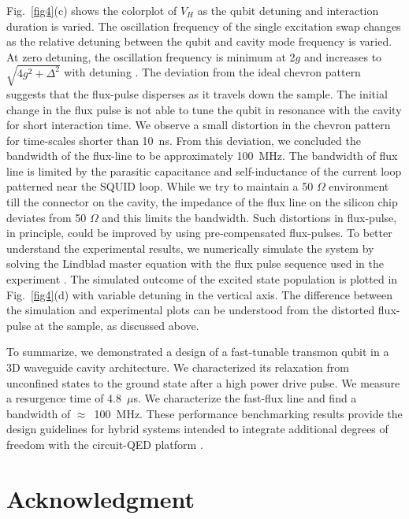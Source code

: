 \documentclass[a4paper, amsfonts, amssymb, amsmath, reprint,showkeys,nofootinbib,superscriptaddress]{revtex4-2}
\begin{document}
%
%
Fig.~\ref{fig4}(c) shows the colorplot of $V_H$ as the qubit 
detuning and interaction duration is varied. The oscillation frequency 
of the single excitation swap changes as the relative detuning between the qubit 
and cavity mode frequency is varied.
%
At zero detuning, the oscillation frequency is minimum at 2$g$ and increases 
to $\sqrt{4 g^2 + \Delta^2}$ with detuning \cite{oconnell_quantum_2010}. 
%
The deviation from the ideal chevron pattern suggests that the flux-pulse
disperses as it travels down the sample. The initial change in the flux pulse 
is not able to tune the qubit in resonance with the cavity for short interaction 
time. We observe a small distortion in the chevron pattern for time-scales 
shorter than 10~ns. From this deviation, we concluded the bandwidth of the flux-line to 
be approximately 100~MHz. The bandwidth of flux line is limited by the 
parasitic capacitance and self-inductance of the current loop patterned 
near the SQUID loop. While we try to maintain a 50 $\Omega$ environment 
till the connector on the cavity, the impedance of the flux line on the 
silicon chip deviates from 50 $\Omega$ and this limits the bandwidth.
Such distortions in flux-pulse, in principle, could be improved by using 
pre-compensated flux-pulses. To better understand the experimental 
results, we numerically simulate the system 
by solving the Lindblad master equation with the flux pulse sequence used in the 
experiment \cite{johansson_qutip_2012}.
%
The simulated outcome of the excited state population is plotted 
in Fig.~\ref{fig4}(d) with 
variable detuning in the vertical axis. 
The difference between the simulation and experimental 
plots can be understood from the distorted flux-pulse at the sample, 
as discussed above. 




To summarize, we demonstrated a design of a fast-tunable transmon qubit in 
a 3D waveguide cavity architecture. We characterized its relaxation from unconfined 
states to the ground state after a high power drive pulse.
We measure a resurgence time of 4.8~$\mu$s. We characterize the fast-flux line
and find a bandwidth of $\approx$~100~MHz.
These performance benchmarking results provide the design 
guidelines for hybrid systems intended to integrate additional degrees of freedom 
with the circuit-QED platform \cite{gunupudi_optomechanical_2019, peterson_ultrastrong_2019}. 





\section*{Acknowledgment}
\end{document}
